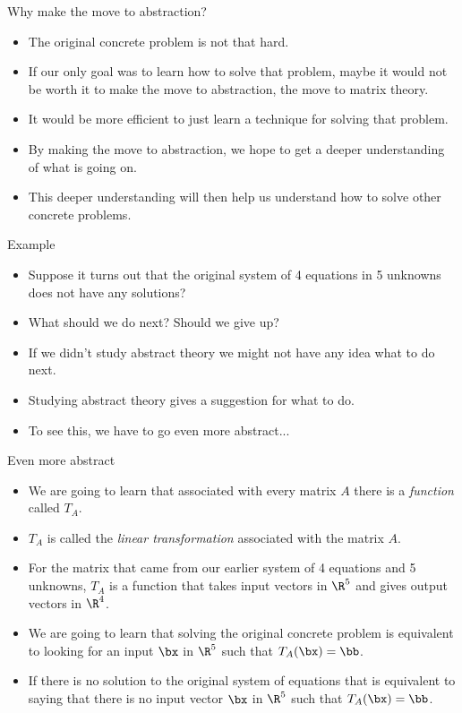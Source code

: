 \documentclass{beamer}
\begin{document}
\begin{frame} {Why make the move to abstraction?}
\begin{itemize}
\item The original concrete problem is not that hard.
\item If our only goal was to learn how to solve that problem, maybe it would
not be worth it to make the move to abstraction, the move to matrix
theory.
\item It would be more efficient to just learn a technique for solving that problem.
\item By making the move to abstraction, we hope to get a deeper understanding
of what is going on.
\item This deeper understanding will then help us understand how to solve
other concrete problems.
\end{itemize}
\end{frame}

\begin{frame} {Example}
\begin{itemize}
\item Suppose it turns out that the original system of 4 equations in 5 unknowns
does not have any solutions?
\item What should we do next?  Should we give up?
\item If we didn't study abstract theory we might
not have any idea what to do next.
\item Studying abstract theory gives a suggestion for what to do.
\item To see this, we have to go even more abstract...
\end{itemize}
\end{frame}


\begin{frame} {Even more abstract}
\begin{itemize}
\item We are going to learn that associated with every matrix $A$ there is
a \emph{function} called $T_A$.
\item $T_A$ is called the \emph{linear transformation} associated with the
matrix $A$.
\item For the matrix that came from our earlier system of 4 equations and 5 unknowns,
$T_A$ is a function that takes input vectors in $\R^5$ and gives output vectors in $\R^4$.
\item We are going to learn that solving the original concrete problem is equivalent
to looking for an input $\bx$ in $\R^5$ such that $T_A(\bx) = \bb$.
\item If there is no solution to the original system of equations that is
equivalent to saying that there is no input vector $\bx$ in $\R^5$ such that $T_A(\bx) = \bb$.
\end{itemize}
\end{frame}
\end{document}
